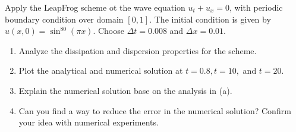 \documentclass[12pt,a4paper]{report}
\begin{document}
Apply the LeapFrog scheme ot the wave equation $u_t+u_x=0$, with periodic boundary condition over domain $[0,1]$.  The initial condition is given by $u(x,0)=\sin^{80}(\pi x)$.  Choose $\Delta t = 0.008$ and $\Delta x=0.01$.

\begin{enumerate}[label=(\alph*)]

	\item Analyze the dissipation and dispersion properties for the scheme.
	
	\item Plot the analytical and numerical solution at $t=0.8, t=10,$ and $t=20$.
	
	\item Explain the numerical solution base on the analysis in (a).
	
	\item Can you find a way to reduce the error in the numerical solution?  Confirm your idea with numerical experiments.

\end{enumerate}
\end{document}
